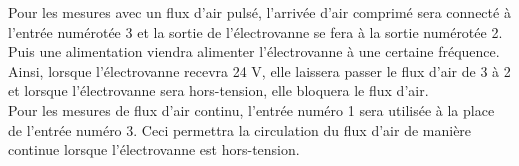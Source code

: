 \begin{itemize}
          Pour les mesures avec un flux d'air pulsé, l'arrivée d'air comprimé sera connecté à l'entrée numérotée 3 et la sortie de l'électrovanne se fera à 
          la sortie numérotée 2. \\
          Puis une alimentation viendra alimenter l'électrovanne à une certaine fréquence. Ainsi, lorsque l'électrovanne recevra 24 V, elle laissera 
          passer le flux d'air de 3 à 2 et lorsque l'électrovanne sera hors-tension, elle bloquera le flux d'air. \\
          
          Pour les mesures de flux d'air continu, l'entrée numéro 1 sera utilisée à la place de l'entrée numéro 3. Ceci permettra la circulation du 
          flux d'air de manière continue lorsque l'électrovanne est hors-tension. \\
          

\end{itemize}
